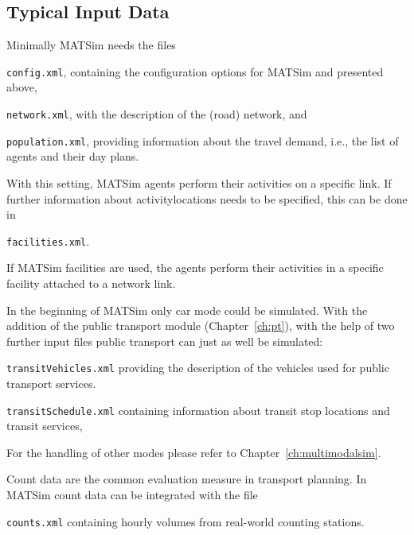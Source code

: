 \subsection{Typical Input Data}
\label{sec:inputdata}
Minimally MATSim needs the files
\begin{compactitem}
	\item \lstinline|config.xml|, containing the configuration options for MATSim and presented above,
	\item \lstinline|network.xml|, with the description of the (road) network, and
	\item \lstinline|population.xml|, providing information about	the travel demand, i.e., the list of agents and their day plans.
\end{compactitem}
%
With this setting, MATSim agents perform their activities on a specific \gls{link}. If further information about \glspl{activitylocation} needs to be specified, this can be done in 
\begin{compactitem}
\item \lstinline|facilities.xml|. 
\end{compactitem}
%
If MATSim facilities are used, the agents perform their activities in a specific \gls{facility} attached to a network link.

In the beginning of MATSim only car mode could be simulated. With the addition of the public transport module (Chapter~\ref{ch:pt}), with the help of two further input files public transport can just as well be simulated:
\begin{compactitem}
\item \lstinline|transitVehicles.xml| providing the description of the vehicles used for public transport services. 
\item \lstinline|transitSchedule.xml| containing information about transit stop locations and transit services,
\end{compactitem}
%
For the handling of other modes please refer to Chapter~\ref{ch:multimodalsim}.

Count data are the common evaluation measure in transport planning. In MATSim count data can be integrated with the file
\begin{compactitem}
\item \lstinline|counts.xml| containing hourly volumes from real-world counting stations.
\end{compactitem}

